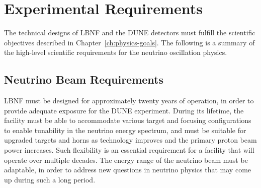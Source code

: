 \section{Experimental Requirements}
\label{sec:physics-lbnosc-det-req}

The technical designs of LBNF and the DUNE detectors must fulfill the
scientific objectives described in Chapter~\ref{ch:physics-goals}. The
following is a summary of the high-level scientific requirements for
the neutrino oscillation physics.

\subsection{Neutrino Beam Requirements}
\label{sec:physics-lbnosc-beam-req}

LBNF must be designed for approximately twenty years of
operation, in order to provide adequate exposure for the DUNE
experiment. During its lifetime, the facility must be able to
accommodate various target and focusing configurations to enable
tunability in the neutrino energy spectrum, and must be suitable for
upgraded targets and horns as technology improves and the primary
proton beam power increases. Such flexibility is an essential
requirement for a facility that will operate over multiple
decades. The energy range of the neutrino beam must be adaptable, in
order to address new questions in neutrino physics that may come up
during such a long period.

